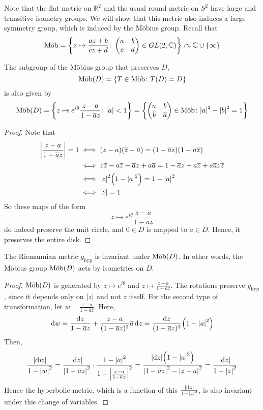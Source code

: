 Note that the flat metric on \( \mathbb R^2 \) and the usual round metric on \( S^2 \) have large and transitive isometry groups.
We will show that this metric also induces a large symmetry group, which is induced by the M\"obius group.
Recall that
\[ \text{M\"ob} = \qty{z \mapsto \frac{az+b}{cz+d} \colon \begin{pmatrix}
	a & b \\
	c & d
\end{pmatrix} \in GL(2,\mathbb C)} \curvearrowright \mathbb C \cup \qty{\infty} \]
\begin{lemma}
	The subgroup of the M\"obius group that preserves \( D \),
	\[ \text{M\"ob}(D) = \qty{T \in \text{M\"ob}\colon T(D) = D} \]
	is also given by
	\[ \text{M\"ob}(D) = \qty{z \mapsto e^{i\theta} \frac{z-a}{1-\overline a z} \colon \abs{a} < 1} = \qty{\begin{pmatrix}
		a & b \\
		\overline b & \overline a
	\end{pmatrix} \in \text{M\"ob}\colon \abs{a}^2 - \abs{b}^2 = 1} \]
\end{lemma}
\begin{proof}
	Note that
	\begin{align*}
		\abs{\frac{z-a}{1-\overline a z}} = 1 &\iff (z-a)(\overline z - \overline a) = (1 - \overline a z)(1 - a \overline z) \\
		&\iff z\overline z - a\overline z - \overline a z + a \overline a = 1 - \overline a z - a \overline z + a \overline a z \overline z \\
		&\iff \abs{z}^2\qty(1 - \abs{a}^2) = 1 - \abs{a}^2 \\
		&\iff \abs{z} = 1
	\end{align*}
	So these maps of the form
	\[ z \mapsto e^{i\theta} \frac{z-a}{1-\overline a z} \]
	do indeed preserve the unit circle, and \( 0 \in D \) is mapped to \( a \in D \).
	Hence, it preserves the entire disk.
\end{proof}
\begin{lemma}
	The Riemannian metric \( g_{\text{hyp}} \) is invariant under \( \text{M\"ob}(D) \).
	In other words, the M\"obius group \( \text{M\"ob}(D) \) acts by isometries on \( D \).
\end{lemma}
\begin{proof}
	\( \text{M\"ob}(D) \) is generated by \( z \mapsto e^{i\theta} \) and \( z \mapsto \frac{z-a}{1-\overline a z} \).
	The rotations preserve \( g_{\text{hyp}} \), since it depends only on \( \abs{z} \) and not \( z \) itself.
	For the second type of transformation, let \( w = \frac{z-a}{1-\overline a z} \).
	Here,
	\[ \dd{w} = \frac{\dd{z}}{1-\overline a z} + \frac{z-a}{(1-\overline a z)^2} \overline a \dd{z} = \frac{\dd{z}}{(1-\overline a z)^2} \qty(1 - \abs{a}^2) \]
	Then,
	\[ \frac{\abs{\dd{w}}}{1-\abs{w}^2} = \frac{\abs{\dd{z}}}{\abs{1-\overline a z}^2} \cdot \frac{1 - \abs{a}^2}{1-\abs{\frac{z-a}{1-\overline a z}}^2} = \frac{\abs{\dd{z}} \qty(1-\abs{a}^2)}{\abs{1-\overline a z}^2 - \abs{z-a}^2} = \frac{\abs{\dd{z}}}{1-\abs{z}^2} \]
	Hence the hyperbolic metric, which is a function of this \( \frac{\abs{\dd{z}}}{1-\abs{z}^2} \), is also invariant under this change of variables.
\end{proof}
